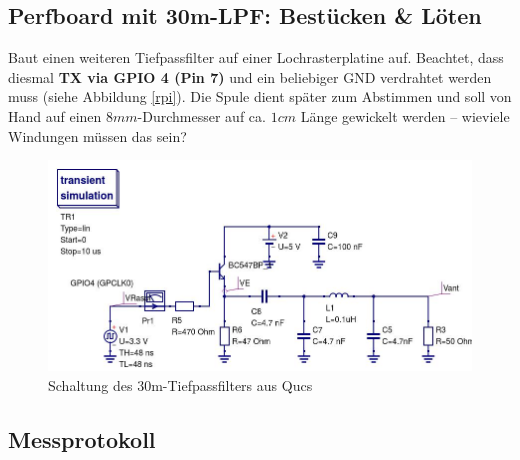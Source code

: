 \subsection*{Perfboard mit 30m-LPF: Bestücken \& Löten}

Baut einen weiteren Tiefpassfilter auf einer Lochrasterplatine auf. Beachtet,
dass diesmal \textbf{TX via GPIO 4 (Pin 7)} und ein beliebiger GND verdrahtet
werden muss (siehe Abbildung \ref{rpi}). Die Spule dient später zum Abstimmen
und soll von Hand auf einen $8mm$-Durchmesser auf ca. $1cm$ Länge gewickelt
werden -- wieviele Windungen müssen das sein?

\begin{figure}[H]
    \centering
    \includegraphics[width=1\textwidth]{Messtechnik/Bilder/30mRaspiAmpLP.jpg}
    \caption{Schaltung des 30m-Tiefpassfilters aus Qucs}
    \label{30mLP}
\end{figure}

\subsection*{Messprotokoll}


